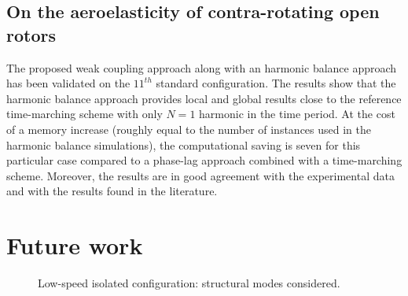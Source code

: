 \subsection*{On the aeroelasticity of contra-rotating open rotors}

The proposed weak coupling approach along with
an harmonic balance approach has been
validated on the $11^{th}$ standard configuration. 
The results show that the harmonic balance approach provides local
and global results close to the reference time-marching scheme 
with only $N=1$ harmonic in the time period. At the cost of a memory
increase (roughly equal to the number of instances used in the harmonic balance
simulations), the computational saving is seven for this
particular case compared to a phase-lag approach combined
with a time-marching scheme. 
Moreover, the results are
in good agreement with the experimental data and with the results
found in the literature.





\section*{Future work}

\begin{figure}[htp]
  \centering
  \caption{Low-speed isolated configuration: structural modes considered.}
  \label{fig:hera3_perspectives}
\end{figure}

